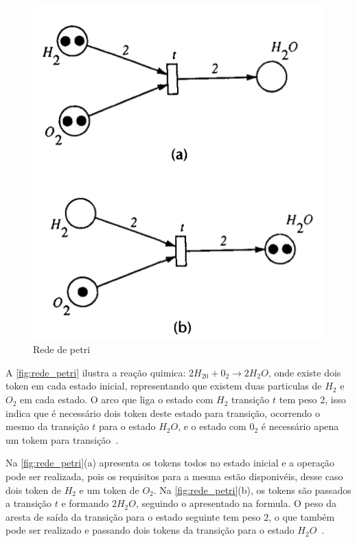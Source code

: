 \begin{figure}[H]
	\begin{center}
    \caption{\label{fig:rede_petri}Rede de petri}
	\includegraphics[scale=0.60]{Figuras/rede_petri.png}
	\end{center}
\end{figure}

\par
A \autoref{fig:rede_petri} ilustra a reação quimica: $2H_20 + 0_2 \rightarrow 2H_2O$, onde existe dois token em cada estado inicial, representando que existem duas particulas de $H_2$ e $O_2$ em cada estado. O arco que liga o estado com $H_2$  transição $t$ tem peso 2, isso indica que é necessário dois token deste estado para transição, ocorrendo o mesmo da transição $t$ para o estado $H_2O$, e o estado com $0_2$ é necessário apena um tokem para transição~\cite{murata1989petri}.

\par
Na \autoref{fig:rede_petri}(a) apresenta os tokens todos no estado inicial e a operação pode ser realizada, pois os requisitos para a mesma estão disponivéis, desse caso dois token de $H_2$ e um token de $O_2$. Na \autoref{fig:rede_petri}(b), os tokens são passados a transição $t$ e formando $2H_2O$, seguindo o apresentado na formula. O peso da aresta de saída da transição para o estado seguinte tem peso 2, o que também pode ser realizado e passando dois tokens da transição para o estado $H_2O$~\cite{murata1989petri}.


